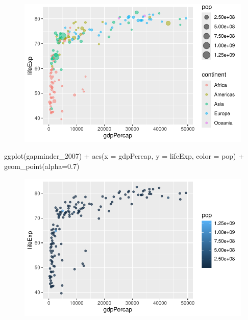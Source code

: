 \documentclass[
  letterpaper,
  DIV=11,
  numbers=noendperiod]{scrartcl}
\newenvironment{Shaded}{\begin{snugshade}}{\end{snugshade}}
\newcommand{\AttributeTok}[1]{\textcolor[rgb]{0.40,0.45,0.13}{#1}}
\newcommand{\FloatTok}[1]{\textcolor[rgb]{0.68,0.00,0.00}{#1}}
\newcommand{\FunctionTok}[1]{\textcolor[rgb]{0.28,0.35,0.67}{#1}}
\newcommand{\NormalTok}[1]{\textcolor[rgb]{0.00,0.23,0.31}{#1}}
\newcommand{\SpecialCharTok}[1]{\textcolor[rgb]{0.37,0.37,0.37}{#1}}
\begin{document}
\begin{figure}[H]

{\centering \includegraphics{class05_files/figure-pdf/unnamed-chunk-20-1.pdf}

}

\end{figure}

\begin{Shaded}
\begin{Highlighting}[]
\FunctionTok{ggplot}\NormalTok{(gapminder\_2007) }\SpecialCharTok{+} 
  \FunctionTok{aes}\NormalTok{(}\AttributeTok{x =}\NormalTok{ gdpPercap, }\AttributeTok{y =}\NormalTok{ lifeExp, }\AttributeTok{color =}\NormalTok{ pop) }\SpecialCharTok{+}
  \FunctionTok{geom\_point}\NormalTok{(}\AttributeTok{alpha=}\FloatTok{0.7}\NormalTok{)}
\end{Highlighting}
\end{Shaded}

\begin{figure}[H]

{\centering \includegraphics{class05_files/figure-pdf/unnamed-chunk-21-1.pdf}

}

\end{figure}
\end{document}
